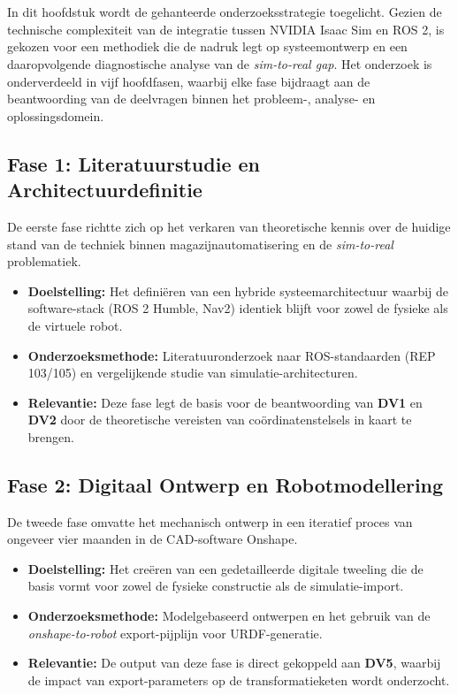 
\chapter{}%
\label{ch:methodologie}

In dit hoofdstuk wordt de gehanteerde onderzoeksstrategie toegelicht. Gezien de technische complexiteit van de integratie tussen NVIDIA Isaac Sim en ROS 2, is gekozen voor een methodiek die de nadruk legt op systeemontwerp en een daaropvolgende diagnostische analyse van de \textit{sim-to-real gap}. Het onderzoek is onderverdeeld in vijf hoofdfasen, waarbij elke fase bijdraagt aan de beantwoording van de deelvragen binnen het probleem-, analyse- en oplossingsdomein.

\section{Fase 1: Literatuurstudie en Architectuurdefinitie}
De eerste fase richtte zich op het verkaren van theoretische kennis over de huidige stand van de techniek binnen magazijnautomatisering en de \textit{sim-to-real} problematiek. 
\begin{itemize}
    \item \textbf{Doelstelling:} Het definiëren van een hybride systeemarchitectuur waarbij de software-stack (ROS 2 Humble, Nav2) identiek blijft voor zowel de fysieke als de virtuele robot.
    \item \textbf{Onderzoeksmethode:} Literatuuronderzoek naar ROS-standaarden (REP 103/105) en vergelijkende studie van simulatie-architecturen.
    \item \textbf{Relevantie:} Deze fase legt de basis voor de beantwoording van \textbf{DV1} en \textbf{DV2} door de theoretische vereisten van coördinatenstelsels in kaart te brengen.
\end{itemize}

\section{Fase 2: Digitaal Ontwerp en Robotmodellering}
De tweede fase omvatte het mechanisch ontwerp in een iteratief proces van ongeveer vier maanden in de CAD-software Onshape. 
\begin{itemize}
    \item \textbf{Doelstelling:} Het creëren van een gedetailleerde digitale tweeling die de basis vormt voor zowel de fysieke constructie als de simulatie-import.
    \item \textbf{Onderzoeksmethode:} Modelgebaseerd ontwerpen en het gebruik van de \textit{onshape-to-robot} export-pijplijn voor URDF-generatie.
    \item \textbf{Relevantie:} De output van deze fase is direct gekoppeld aan \textbf{DV5}, waarbij de impact van export-parameters op de transformatieketen wordt onderzocht.
\end{itemize}

